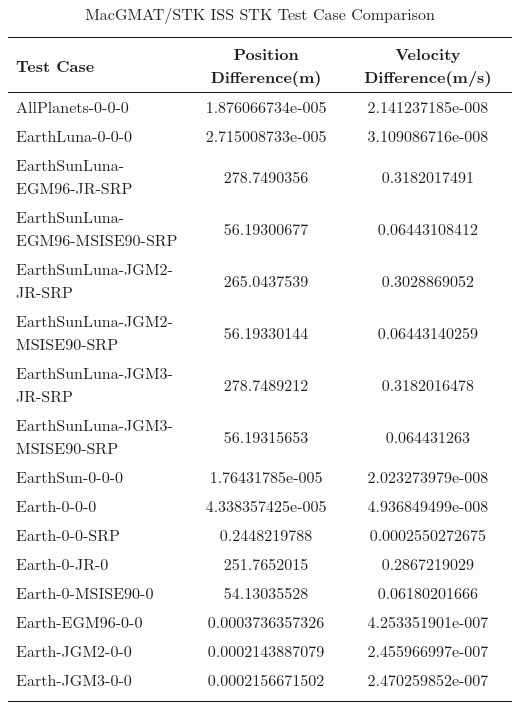 \begin{table}[htbp!]
\centering
\caption{ MacGMAT/STK ISS STK Test Case Comparison}
      \begin{tabular}{lcc}
      \hline\hline
          Test Case & Position Difference(m) & Velocity Difference(m/s) \\
         \hline
         AllPlanets-0-0-0 & 1.876066734e-005 & 2.141237185e-008 \\
         EarthLuna-0-0-0 & 2.715008733e-005 & 3.109086716e-008 \\
         EarthSunLuna-EGM96-JR-SRP & 278.7490356 & 0.3182017491 \\
         EarthSunLuna-EGM96-MSISE90-SRP & 56.19300677 & 0.06443108412 \\
         EarthSunLuna-JGM2-JR-SRP & 265.0437539 & 0.3028869052 \\
         EarthSunLuna-JGM2-MSISE90-SRP & 56.19330144 & 0.06443140259 \\
         EarthSunLuna-JGM3-JR-SRP & 278.7489212 & 0.3182016478 \\
         EarthSunLuna-JGM3-MSISE90-SRP & 56.19315653 & 0.064431263 \\
         EarthSun-0-0-0 & 1.76431785e-005 & 2.023273979e-008 \\
         Earth-0-0-0 & 4.338357425e-005 & 4.936849499e-008 \\
         Earth-0-0-SRP & 0.2448219788 & 0.0002550272675 \\
         Earth-0-JR-0 & 251.7652015 & 0.2867219029 \\
         Earth-0-MSISE90-0 & 54.13035528 & 0.06180201666 \\
         Earth-EGM96-0-0 & 0.0003736357326 & 4.253351901e-007 \\
         Earth-JGM2-0-0 & 0.0002143887079 & 2.455966997e-007 \\
         Earth-JGM3-0-0 & 0.0002156671502 & 2.470259852e-007 \\
      \hline\hline
      \label{Table: ISS STK Table} 
\end{tabular}
\end{table}
